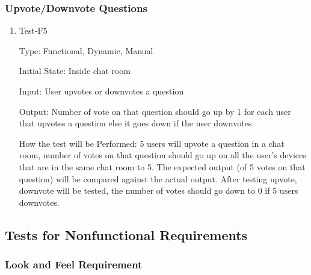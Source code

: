\documentclass[12pt, titlepage]{article}
\begin{document}
\subsubsection{Upvote/Downvote Questions}
		

\begin{enumerate}

\item{Test-F5\\}

Type: Functional, Dynamic, Manual
	
Initial State: Inside chat room

Input: User upvotes or downvotes a question

Output: Number of vote on that question should go up by 1 for each user that upvotes a question else it goes down if the user downvotes. 

How the test will be Performed: 5 users will upvote a question in a chat room, number of votes on that question should go up on all the user’s devices that are in the same chat room to 5. The expected output (of 5 votes on that question) will be compared against the actual output. After testing upvote, downvote will be tested, the number of votes should go down to 0 if 5 users downvotes.  

\end{enumerate}

\subsection{Tests for Nonfunctional Requirements}

\subsubsection{Look and Feel Requirement }
		
\end{document}
